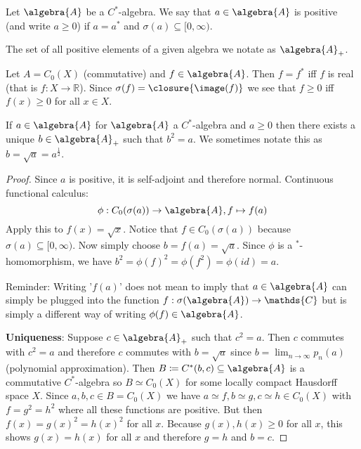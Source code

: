 \documentclass[a4paper]{article}
\begin{document}
\begin{definition}
	Let $\algebra{A}$ be a $C^*$-algebra. We say that $a \in \algebra{A}$ is positive (and write $a \geq 0$) if $a = a^*$ and $\sigma(a) \subseteq [0, \infty)$. 

	The set of all positive elements of a given algebra we notate as $\algebra{A}_+$.
\end{definition}

\begin{example}
	Let $A = C_0(X)$ (commutative) and $f \in \algebra{A}$. Then $f = f^*$ iff $f$ is real (that is $f: X \to \mathds{R}$). Since $\sigma(f) = \closure{\image(f)}$ we see that $f \geq 0$ iff $f(x) \geq 0$ for all $x \in X$.
\end{example}

\begin{theorem}
	If $a \in \algebra{A}$ for $\algebra{A}$ a $C^*$-algebra and $a \geq 0$ then there exists a unique $b \in \algebra{A}_+$ such that $b^2 = a$.
	We sometimes notate this as $b = \sqrt{a} = a^{\frac{1}{2}}$.
\end{theorem}

\begin{proof}
	Since $a$ is positive, it is self-adjoint and therefore normal.
	Continuous functional calculus:
	\begin{equation*}
		\phi: C_0(\sigma(a)) \to \algebra{A}, f \mapsto f(a)
	\end{equation*}
	Apply this to $f(x) = \sqrt{x}$.
	Notice that $f \in C_0(\sigma(a))$ because $\sigma(a) \subseteq [0, \infty)$.
	Now simply choose $b = f(a) = \sqrt{a}$.
	Since $\phi$ is a $^*$-homomorphism, we have $b^2 = \phi(f)^2 = \phi(f^2) = \phi(id) = a$.

	Reminder: Writing '$f(a)$' does not mean to imply that $a \in \algebra{A}$ can simply be plugged into the function $f: \sigma(\algebra{A}) \to \mathds{C}$ but is simply a different way of writing $\phi(f) \in \algebra{A}$.

	\textbf{Uniqueness}: Suppose $c \in \algebra{A}_+$ such that $c^2 = a$.
	Then $c$ commutes with $c^2 = a$ and therefore $c$ commutes with $b = \sqrt{a}$ since $b = \lim_{n \to \infty} p_n(a)$ (polynomial approximation).
	Then $B \coloneq C^*(b,c) \subseteq \algebra{A}$ is a commutative $C^*$-algebra so $B \simeq C_0(X)$ for some locally compact Hausdorff space $X$.
	Since $a,b,c \in B = C_0(X)$ we have $a \simeq f, b \simeq g, c \simeq h \in C_0(X)$ with $f = g^2 = h^2$ where all these functions are positive. 
	But then $f(x) = g(x)^2 = h(x)^2$ for all $x$.
	Because $g(x), h(x) \geq 0$ for all $x$, this shows $g(x) = h(x)$ for all $x$ and therefore $g = h$ and $b = c$.
\end{proof}
\end{document}
